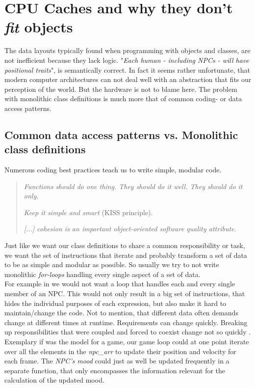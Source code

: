 \section{CPU Caches and why they don't \textit{fit} objects}\label{cpu_caches}
The data layouts typically found when programming with objects and classes, are not inefficient because they lack logic. "\textit{Each human - including NPCs - will have positional traits}", is semantically correct. In fact it seems rather unfortunate, that modern computer architectures can not deal well with an abstraction that fits our perception of the world. But the hardware is not to blame here. The problem with monolithic class definitions is much more that of common coding- or data access patterns.\\

\subsection{Common data access patterns vs. Monolithic class definitions}\label{cdap}
Numerous coding best practices teach us to write simple, modular code.
\begin{quote}
	\textit{Functions should do one thing. They should do it well. They should do it only.} 
	
	\textit{Keep it simple and smart} (KISS principle). 
	
	\textit{[...] cohesion is an important object-oriented
		software quality attribute.}
\end{quote}
Just like we want our class definitions to share a common responsibility or task, we want the set of instructions that iterate and probably transform a set of data to be as simple and modular as possible. So usually we try to not write monolithic \textit{for-loops} handling every single aspect of a set of data.\\ For example in  we would not want a loop that handles each and every single member of an NPC. This would not only result in a big set of instructions, that hides the individual purposes of each expression, but also make it hard to maintain/change the code. Not to mention, that different data often demands change at different times at runtime. Requirements can change quickly. Breaking up responsibilities that were coupled and forced to coexist change not so quickly .\\
Exemplary if  was the model for a game, our game loop could at one point iterate over all the elements in the \textit{npc\_arr} to update their position and velocity for each frame. The \textit{NPC's mood} could just as well be updated frequently in a separate function, that only encompasses the information relevant for the calculation of the updated mood.
